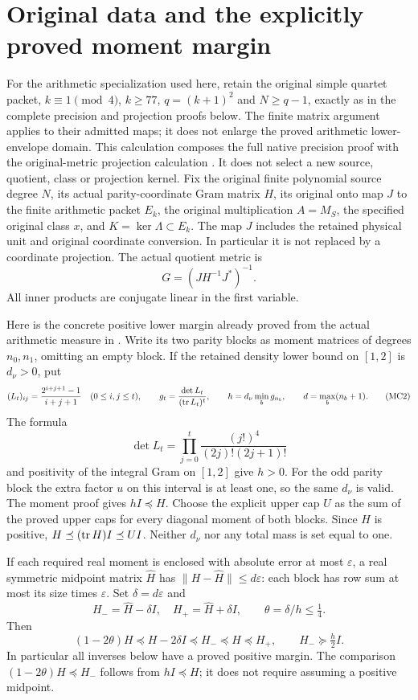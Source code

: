 \section{Original data and the explicitly proved moment margin}
For the arithmetic specialization used here, retain the original simple
quartet packet, $k\equiv1\pmod4$, $k\ge77$, $q=(k+1)^2$ and
$N\ge q-1$, exactly as in the complete precision and projection
proofs below. The finite matrix argument applies to their admitted
maps; it does not enlarge the proved arithmetic lower-envelope domain.
This calculation composes the full native precision proof
\cite{mcomp:precision} with the original-metric projection calculation
\cite{mcomp:projection}. It does not select a new source, quotient, class or
projection kernel. Fix the original finite polynomial source degree $N$,
its actual parity-coordinate Gram matrix $H$, its original onto map
$J$ to the finite arithmetic packet $E_k$, the original multiplication
$A=M_S$, the specified original class $x$, and $K=\ker\Lambda\subset E_k$.
The map $J$ includes the retained physical unit and original coordinate
conversion. In particular it is not replaced by a coordinate projection.
The actual quotient metric is
\[
 G=(JH^{-1}J^*)^{-1}.                                      \tag{MC1}
\]
All inner products are conjugate linear in the first variable.

Here is the concrete positive lower margin already proved from the actual
arithmetic measure in \cite{mcomp:precision}. Write its two parity blocks as
moment matrices of degrees $n_0,n_1$, omitting an empty block. If the
retained density lower bound on $[1,2]$ is $d_\nu>0$, put
\[
 (L_t)_{ij}=\frac{2^{i+j+1}-1}{i+j+1}\quad(0\le i,j\le t),
 \qquad g_t=\frac{\det L_t}{(\operatorname{tr} L_t)^t},\qquad
 h=d_\nu\min_{b}g_{n_b},\qquad d=\max_b(n_b+1).              \tag{MC2}
\]
The formula
\[
 \det L_t=\prod_{j=0}^t\frac{(j!)^4}{(2j)!(2j+1)!}
\]
and positivity of the integral Gram on $[1,2]$ give $h>0$.
For the odd parity block the extra factor $u$ on this interval is at
least one, so the same $d_\nu$ is valid. The moment proof gives
$hI\preceq H$. Choose the explicit upper cap $U$ as the sum of
the proved upper caps for every diagonal moment of both blocks. Since
$H$ is positive, $H\preceq(\operatorname{tr} H)I\preceq UI$.
Neither $d_\nu$ nor any total mass is set equal to one.

If each required real moment is enclosed with absolute error at most
$\varepsilon$, a real symmetric midpoint matrix $\widehat H$ has
$\|H-\widehat H\|\le d\varepsilon$: each block has row sum at most
its size times $\varepsilon$. Set $\delta=d\varepsilon$ and
\[
 H_-=\widehat H-\delta I,\quad H_+=\widehat H+\delta I,
 \qquad \theta=\delta/h\le\tfrac14.
                                                               \tag{MC3}
\]
Then
\[
 (1-2\theta)H\preceq H-2\delta I\preceq H_-
 \preceq H\preceq H_+,
 \qquad H_-\succeq\tfrac h2 I.                                \tag{MC4}
\]
In particular all inverses below have a proved positive margin. The
comparison $(1-2\theta)H\preceq H_-$ follows from $hI\preceq H$;
it does not require assuming a positive midpoint.

